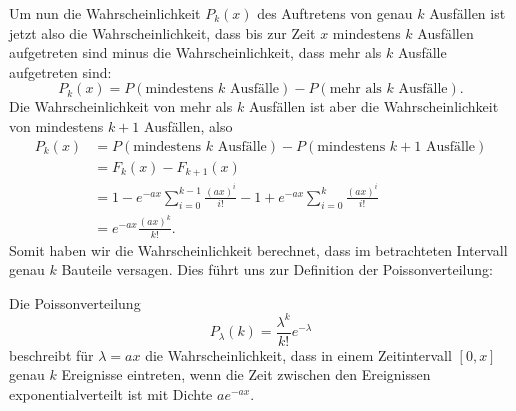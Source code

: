 Um nun die Wahrscheinlichkeit $P_k(x)$ des Auftretens von genau $k$ Ausfällen
ist jetzt also die Wahrscheinlichkeit, dass bis zur Zeit $x$ mindestens
$k$ Ausfällen aufgetreten sind minus die Wahrscheinlichkeit, dass mehr
als $k$ Ausfälle aufgetreten sind: 
\[
P_k(x)=P(\text{mindestens $k$ Ausfälle})-P(\text{mehr als $k$ Ausfälle}).
\]
Die Wahrscheinlichkeit von mehr als $k$ Ausfällen ist aber die Wahrscheinlichkeit
von mindestens $k+1$ Ausfällen, also
\begin{align*}
P_k(x)
&=P(\text{mindestens $k$ Ausfälle})-P(\text{mindestens $k+1$ Ausfälle})\\
&=F_k(x)-F_{k+1}(x)\\
&=1-e^{-ax}\sum_{i=0}^{k-1}\frac{(ax)^i}{i!}-1+e^{-ax}\sum_{i=0}^{k}\frac{(ax)^i}{i!}\\
&=e^{-ax}\frac{(ax)^k}{k!}.
\end{align*}
Somit haben wir die Wahrscheinlichkeit berechnet, dass im betrachteten
Intervall genau $k$ Bauteile versagen.
Dies führt uns zur Definition der Poissonverteilung:
\begin{definition} Die Poissonverteilung
\[
P_\lambda(k)=\frac{\lambda^k}{k!}e^{-\lambda}
\]
beschreibt für $\lambda=ax$ die Wahrscheinlichkeit,
dass in einem Zeitintervall $[0,x]$ genau $k$ Ereignisse eintreten, wenn
die Zeit zwischen den Ereignissen exponentialverteilt ist mit Dichte
$ae^{-ax}$.
\end{definition}

